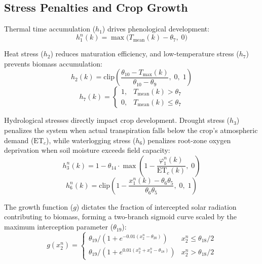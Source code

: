 \subsection{Stress Penalties and Crop Growth}
\label{sec:stress_growth}

Thermal time accumulation ($h_1$) drives phenological development:
\begin{equation}
    h_1^n(k) = \max\!\big(T_{\text{mean}}(k) - \theta_7,\; 0\big)
\end{equation}

Heat stress ($h_2$) reduces maturation efficiency, and low-temperature stress ($h_7$) prevents biomass accumulation:
\begin{equation}
    h_2(k) = \text{clip}\!\left( \frac{\theta_{10} - T_{\max}(k)}{\theta_{10} - \theta_9},\; 0,\; 1 \right)
\end{equation}
\begin{equation}
    h_7(k) = 
    \begin{cases} 
      1, & T_{\text{mean}}(k) > \theta_7 \\ 
      0, & T_{\text{mean}}(k) \leq \theta_7 
   \end{cases}
\end{equation}

Hydrological stresses directly impact crop development. Drought stress ($h_3$) penalizes the system when actual transpiration falls below the crop's atmospheric demand ($\text{ET}_c$), while waterlogging stress ($h_6$) penalizes root-zone oxygen deprivation when soil moisture exceeds field capacity:
\begin{equation}
    h_3^n(k) = 1 - \theta_{14} \cdot \max\!\left(1 - \frac{\varphi_1^n(k)}{\text{ET}_c(k)},\; 0\right)
\end{equation}
\begin{equation}
    h_6^n(k) = \text{clip}\!\left(1 - \frac{x_1^n(k) - \theta_6\theta_5}{\theta_6\theta_5},\; 0,\; 1\right)
\end{equation}

The growth function ($g$) dictates the fraction of intercepted solar radiation contributing to biomass, forming a two-branch sigmoid curve scaled by the maximum interception parameter ($\theta_{19}$):
\begin{equation}
g(x_2^n) = \begin{cases}
\theta_{19}/(1 + e^{-0.01(x_2^n - \theta_{20})}) & x_2^n \leq \theta_{18}/2 \\
\theta_{19}/(1 + e^{0.01(x_2^n + x_3^n - \theta_{18})}) & x_2^n > \theta_{18}/2
\end{cases}
\end{equation}


